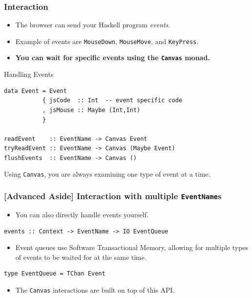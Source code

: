 \documentclass{beamer}
\begin{document}
\begin{frame}[fragile]
\frametitle{Interaction}

\begin{itemize}
\item The browser can send your Haskell program {\em events\/}.
\item Example of events are \verb|MouseDown|, \verb|MouseMove|, and \verb|KeyPress|.
\item {\bf You can wait for specific events using the {\tt Canvas} monad.}
\end{itemize}

\begin{codeblock*}[0.9]{Handling Events}
\begin{verbatim}
data Event = Event
           { jsCode  :: Int  -- event specific code
           , jsMouse :: Maybe (Int,Int)
           }

readEvent    :: EventName -> Canvas Event
tryReadEvent :: EventName -> Canvas (Maybe Event)
flushEvents  :: EventName -> Canvas ()
\end{verbatim}
\end{codeblock*}

\frameskip{}
\frameskip{}
Using {\tt Canvas\/}, you are always examining one type of event at a time.
\end{frame}

\begin{frame}[fragile]
\frametitle{[Advanced Aside] Interaction with multiple {\tt EventName}s}

\begin{itemize}
\item You can also directly handle events yourself.
\end{itemize}
\begin{codeblock}
\begin{verbatim}
events :: Context -> EventName -> IO EventQueue
\end{verbatim}
\end{codeblock}

\begin{itemize}
\item Event queues use Software Transactional Memory, allowing for
multiple types of events to be waited for at the same time.
\end{itemize}
\begin{codeblock}
\begin{verbatim}
type EventQueue = TChan Event
\end{verbatim}
\end{codeblock}

\frameskip{}
\begin{itemize}
\item The {\tt Canvas} interactions are built on top of this API.
\end{itemize}



\end{frame}
\end{document}
